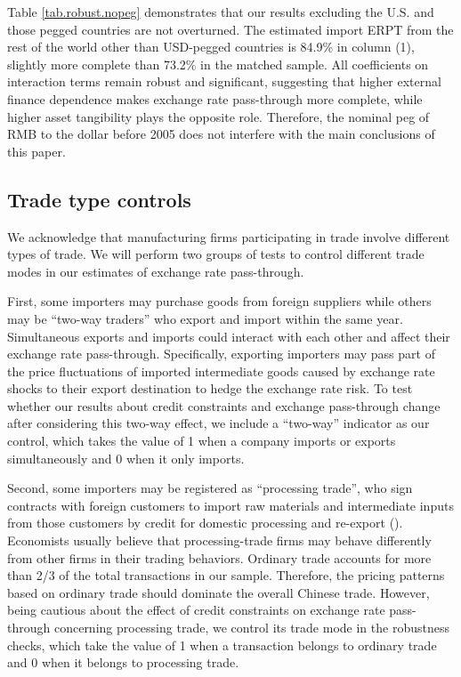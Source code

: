 Table \ref{tab.robust.nopeg} demonstrates that our results excluding the U.S. and those pegged countries are not overturned. The estimated import ERPT from the rest of the world other than USD-pegged countries is 84.9\% in column (1), slightly more complete than 73.2\% in the matched sample. All coefficients on interaction terms remain robust and significant, suggesting that higher external finance dependence makes exchange rate pass-through more complete, while higher asset tangibility plays the opposite role. Therefore, the nominal peg of RMB to the dollar before 2005 does not interfere with the main conclusions of this paper.

\subsection{Trade type controls}

We acknowledge that manufacturing firms participating in trade involve different types of trade. We will perform two groups of tests to control different trade modes in our estimates of exchange rate pass-through.

First, some importers may purchase goods from foreign suppliers while others may be ``two-way traders'' who export and import within the same year. Simultaneous exports and imports could interact with each other and affect their exchange rate pass-through. Specifically, exporting importers may pass part of the price fluctuations of imported intermediate goods caused by exchange rate shocks to their export destination to hedge the exchange rate risk. To test whether our results about credit constraints and exchange pass-through change after considering this two-way effect, we include a ``two-way'' indicator as our control, which takes the value of 1 when a company imports or exports simultaneously and 0 when it only imports.

Second, some importers may be registered as ``processing trade'', who sign contracts with foreign customers to import raw materials and intermediate inputs from those customers by credit for domestic processing and re-export (\cite{manova-yu2016}). Economists usually believe that processing-trade firms may behave differently from other firms in their trading behaviors. Ordinary trade accounts for more than 2/3 of the total transactions in our sample. Therefore, the pricing patterns based on ordinary trade should dominate the overall Chinese trade. However, being cautious about the effect of credit constraints on exchange rate pass-through concerning processing trade, we control its trade mode in the robustness checks, which take the value of 1 when a transaction belongs to ordinary trade and 0 when it belongs to processing trade.

